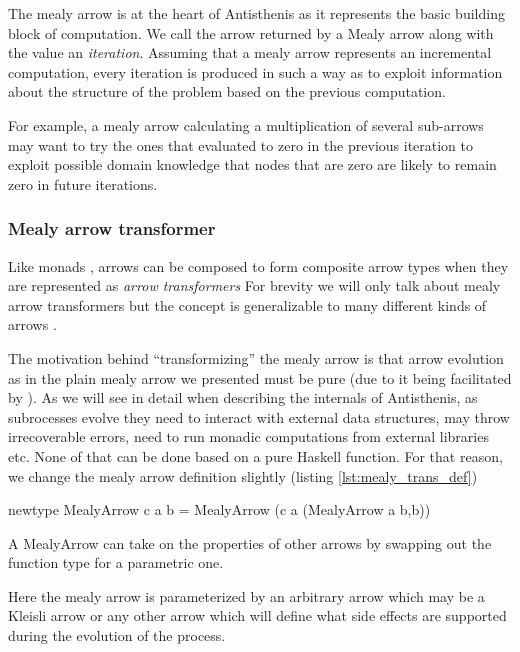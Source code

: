 The mealy arrow is at the heart of Antisthenis as it represents the
basic building block of computation. We call the arrow returned by a
Mealy arrow along with the value an \emph{iteration}. Assuming that a
mealy arrow represents an incremental computation, every iteration is
produced in such a way as to exploit information about the structure
of the problem based on the previous computation.

For example, a mealy arrow calculating a multiplication of several
sub-arrows may want to try the ones that evaluated to zero in the
previous iteration to exploit possible domain knowledge that
nodes that are zero are likely to remain zero in future iterations.

\subsubsection{Mealy arrow transformer}

Like monads \cite{liangMonadTransformersModular1995} , arrows can be
composed to form composite arrow types when they are represented as
\emph{arrow transformers} For brevity we will only talk about mealy
arrow transformers but the concept is generalizable to many different
kinds of arrows \cite{keidelSoundReusableComponents2019a}.

The motivation behind ``transformizing'' the mealy arrow is that arrow
evolution as in the plain mealy arrow we presented must be pure (due
to it being facilitated by \hask{->}). As we will see in detail when
describing the internals of Antisthenis, as subrocesses evolve they
need to interact with external data structures, may throw
irrecoverable errors, need to run monadic computations from external
libraries etc. None of that can be done based on a pure Haskell
function. For that reason, we change the mealy arrow definition
slightly (listing \ref{lst:mealy_trans_def})

\begin{code}
\begin{haskellcode}
newtype MealyArrow c a b =
  MealyArrow (c a (MealyArrow a b,b))
\end{haskellcode}
  \caption{\label{lst:mealy_trans_def}A MealyArrow can take on the
    properties of other arrows by swapping out the function \hask{->}
    type for a parametric one.}
\end{code}

Here the mealy arrow is parameterized by an arbitrary arrow 
which may be a Kleisli arrow or any other arrow which will define what
side effects are supported during the evolution of the process.

